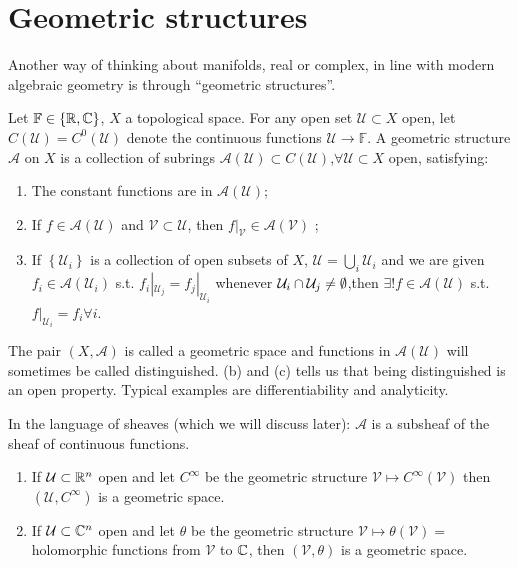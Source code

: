 \section{Geometric structures}
Another way of thinking about manifolds, real or complex, in line with modern algebraic geometry is through ``geometric structures''.
\begin{definition}
  Let $\mathbb{F}\in \left\{\mathbb{R},\mathbb{C}\right\} $, $X$ a topological space. For any open set $\mathcal{U}\subset X$ open, let $C(\mathcal{U})=C^{0}(\mathcal{U})$ denote the continuous functions $\mathcal{U}\to \mathbb{F}$. A geometric structure $\mathcal{A}$ on $X$ is a collection of subrings $\mathcal{A}(\mathcal{U})\subset C(\mathcal{U})$,$\forall \mathcal{U}\subset X$ open, satisfying:
  \begin{enumerate}
    \item The constant functions are in $\mathcal{A}(\mathcal{U})$;
    \item If $f \in \mathcal{A}\left( \mathcal{U} \right) $ and $\mathcal{V}\subset \mathcal{U}$, then $f|_{\mathcal{V}}\in \mathcal{A}\left( \mathcal{V} \right) $ ;
    \item If $\left\{\mathcal{U}_i\right\} $ is a collection of open subsets of $X$, $\mathcal{U}=\bigcup_{i} \mathcal{U}_i$ and we are given $f_i \in \mathcal{A}\left( \mathcal{U}_i \right) $ s.t. $f_i|_{\mathcal{U}_j}=f_j|_{\mathcal{U}_i}$ whenever $\mathcal{U}_i\cap \mathcal{U}_j\neq \emptyset$,then $\exists ! f \in \mathcal{A}\left( \mathcal{U} \right) $ s.t. $f|_{\mathcal{U}_i}=f_i\forall i$.
  \end{enumerate}
  The pair $(X,\mathcal{A})$ is called a geometric space and functions in $\mathcal{A}\left( \mathcal{U} \right) $ will sometimes be called distinguished. (b) and (c) tells us that being distinguished is an open property. Typical examples are differentiability and analyticity.
\end{definition}
In the language of sheaves (which we will discuss later): $\mathcal{A}$ is a subsheaf of the sheaf of continuous functions.
\begin{example}
  \begin{enumerate}
    \item If $\mathcal{U}\subset \mathbb{R}^{n}$ open and let  $C^{\infty}$ be the geometric structure $\mathcal{V}\mapsto C^{\infty}\left( \mathcal{V} \right) $ then $\left( \mathcal{U},C^{\infty} \right) $ is a geometric space.
    \item If $\mathcal{U}\subset \mathbb{C}^{n}$ open and let $\theta $ be the geometric structure $\mathcal{V}\mapsto\theta (\mathcal{V})=$ holomorphic functions from $\mathcal{V}$ to $\mathbb{C}$, then $(\mathcal{V},\theta )$ is a geometric space.
  \end{enumerate}
\end{example}
